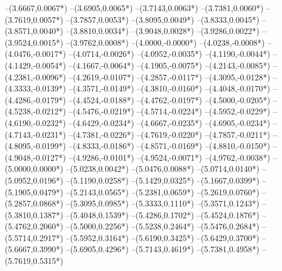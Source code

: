 {	--(3.6667,{0.0067*\yskala})
	--(3.6905,{0.0065*\yskala})
	--(3.7143,{0.0063*\yskala})
	--(3.7381,{0.0060*\yskala})
	--(3.7619,{0.0057*\yskala})
	--(3.7857,{0.0053*\yskala})
	--(3.8095,{0.0049*\yskala})
	--(3.8333,{0.0045*\yskala})
	--(3.8571,{0.0040*\yskala})
	--(3.8810,{0.0034*\yskala})
	--(3.9048,{0.0028*\yskala})
	--(3.9286,{0.0022*\yskala})
	--(3.9524,{0.0015*\yskala})
	--(3.9762,{0.0008*\yskala})
	--(4.0000,{-0.0000*\yskala})
	--(4.0238,{-0.0008*\yskala})
	--(4.0476,{-0.0017*\yskala})
	--(4.0714,{-0.0026*\yskala})
	--(4.0952,{-0.0035*\yskala})
	--(4.1190,{-0.0044*\yskala})
	--(4.1429,{-0.0054*\yskala})
	--(4.1667,{-0.0064*\yskala})
	--(4.1905,{-0.0075*\yskala})
	--(4.2143,{-0.0085*\yskala})
	--(4.2381,{-0.0096*\yskala})
	--(4.2619,{-0.0107*\yskala})
	--(4.2857,{-0.0117*\yskala})
	--(4.3095,{-0.0128*\yskala})
	--(4.3333,{-0.0139*\yskala})
	--(4.3571,{-0.0149*\yskala})
	--(4.3810,{-0.0160*\yskala})
	--(4.4048,{-0.0170*\yskala})
	--(4.4286,{-0.0179*\yskala})
	--(4.4524,{-0.0188*\yskala})
	--(4.4762,{-0.0197*\yskala})
	--(4.5000,{-0.0205*\yskala})
	--(4.5238,{-0.0212*\yskala})
	--(4.5476,{-0.0219*\yskala})
	--(4.5714,{-0.0224*\yskala})
	--(4.5952,{-0.0229*\yskala})
	--(4.6190,{-0.0232*\yskala})
	--(4.6429,{-0.0234*\yskala})
	--(4.6667,{-0.0235*\yskala})
	--(4.6905,{-0.0234*\yskala})
	--(4.7143,{-0.0231*\yskala})
	--(4.7381,{-0.0226*\yskala})
	--(4.7619,{-0.0220*\yskala})
	--(4.7857,{-0.0211*\yskala})
	--(4.8095,{-0.0199*\yskala})
	--(4.8333,{-0.0186*\yskala})
	--(4.8571,{-0.0169*\yskala})
	--(4.8810,{-0.0150*\yskala})
	--(4.9048,{-0.0127*\yskala})
	--(4.9286,{-0.0101*\yskala})
	--(4.9524,{-0.0071*\yskala})
	--(4.9762,{-0.0038*\yskala})
	--(5.0000,{0.0000*\yskala})
	--(5.0238,{0.0042*\yskala})
	--(5.0476,{0.0088*\yskala})
	--(5.0714,{0.0140*\yskala})
	--(5.0952,{0.0196*\yskala})
	--(5.1190,{0.0258*\yskala})
	--(5.1429,{0.0325*\yskala})
	--(5.1667,{0.0399*\yskala})
	--(5.1905,{0.0479*\yskala})
	--(5.2143,{0.0565*\yskala})
	--(5.2381,{0.0659*\yskala})
	--(5.2619,{0.0760*\yskala})
	--(5.2857,{0.0868*\yskala})
	--(5.3095,{0.0985*\yskala})
	--(5.3333,{0.1110*\yskala})
	--(5.3571,{0.1243*\yskala})
	--(5.3810,{0.1387*\yskala})
	--(5.4048,{0.1539*\yskala})
	--(5.4286,{0.1702*\yskala})
	--(5.4524,{0.1876*\yskala})
	--(5.4762,{0.2060*\yskala})
	--(5.5000,{0.2256*\yskala})
	--(5.5238,{0.2464*\yskala})
	--(5.5476,{0.2684*\yskala})
	--(5.5714,{0.2917*\yskala})
	--(5.5952,{0.3164*\yskala})
	--(5.6190,{0.3425*\yskala})
	--(5.6429,{0.3700*\yskala})
	--(5.6667,{0.3990*\yskala})
	--(5.6905,{0.4296*\yskala})
	--(5.7143,{0.4619*\yskala})
	--(5.7381,{0.4958*\yskala})
	--(5.7619,{0.5315*\yskala})
}
